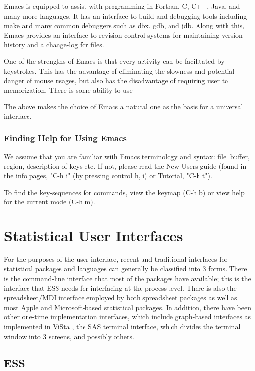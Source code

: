 \documentclass{article}
\begin{document}
Emacs is equipped to assist with programming in Fortran, C, C++, Java,
and many more languages.  It has an interface to build and debugging
tools including make and many common debuggers such as dbx, gdb, and
jdb.   Along with this, Emacs provides an interface to revision control
systems for maintaining version history and a change-log for files.

One of the strengths of Emacs is that every activity can be
facilitated by keystrokes.  This has the advantage of eliminating the
slowness and potential danger of mouse usages, but also has the
disadvantage of requiring user to memorization.  There is some
ability to use 

The above makes the choice of Emacs a natural one as the basis for a
universal interface.

\subsubsection{Finding Help for Using Emacs}

We assume that you are familiar with Emacs terminology and syntax:
file, buffer, region, description of keys etc.  If not, please read
the New Users guide (found in the info pages, "C-h i" (by pressing
control h, i) or Tutorial, "C-h t").

To find the key-sequences for commands, view the keymap (C-h b) or
view help for the current mode (C-h m).  

\section{Statistical User Interfaces}
\label{sec:UI}

For the purposes of the user interface, recent and traditional
interfaces for statistical packages and languages can generally be
classified into 3 forms.  There is the command-line interface that
most of the packages have available; this is the interface that ESS
needs for interfacing at the process level.  There is also the
spreadsheet/MDI interface employed by both spreadsheet packages as
well as most Apple and Microsoft-based statistical packages.  In
addition, there have been other one-time implementation interfaces,
which include graph-based interfaces as implemented in ViSta
\citep{youn:lubi:1995}, the SAS terminal interface, which divides the
terminal window into 3 screens, and possibly others.

\subsection{ESS}
\label{sec:UI:ESS}
\end{document}
